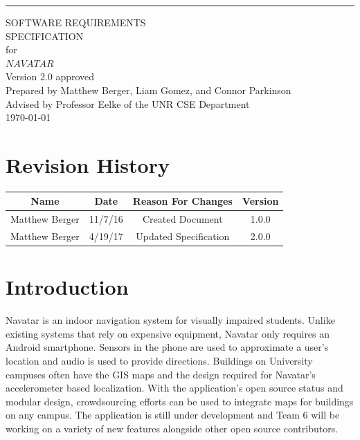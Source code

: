 \documentclass{scrreprt}
\date{}
\def\myversion{2.0 }
\begin{document}
\begin{flushright}
    \rule{16cm}{5pt}\vskip1cm
    \begin{bfseries}
        \Huge{SOFTWARE REQUIREMENTS\\ SPECIFICATION}\\
        \vspace{1.6cm}
        for\\
        \vspace{1.6cm}
        $NAVATAR$\\
        \vspace{1.6cm}
        \LARGE{Version \myversion approved}\\
        \vspace{1.6cm}
        Prepared by Matthew Berger, Liam Gomez, and Connor Parkinson\\ 
        \vspace{1.6cm}
        Advised by Professor Eelke of the UNR CSE Department\\
        \vspace{1.6cm}
        \today\\
    \end{bfseries}
\end{flushright}

{\small\tableofcontents}

\chapter*{Revision History}

\begin{center}
    \begin{tabular}{|c|c|c|c|}
        \hline
	    Name & Date & Reason For Changes & Version\\
        \hline
	    Matthew Berger & 11/7/16 & Created Document & 1.0.0\\
        \hline
        Matthew Berger & 4/19/17 & Updated Specification & 2.0.0\\
        \hline
    \end{tabular}
\end{center}

\chapter{Introduction}

Navatar is an indoor navigation system for visually impaired students. Unlike existing
systems that rely on expensive equipment, Navatar only requires an Android smartphone.
Sensors in the phone are used to approximate a user's location and audio is used to provide
directions. Buildings on University campuses often have the GIS maps and the design required
for Navatar’s accelerometer based localization. With the application’s open source status and
modular design, crowdsourcing efforts can be used to integrate maps for buildings on any
campus. The application is still under development and Team 6 will be working on a variety of
new features alongside other open source contributors.\\
\end{document}
